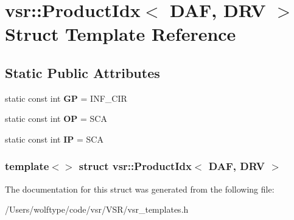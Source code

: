 \hypertarget{structvsr_1_1_product_idx_3_01_d_a_f_00_01_d_r_v_01_4}{\section{vsr\-:\-:Product\-Idx$<$ D\-A\-F, D\-R\-V $>$ Struct Template Reference}
\label{structvsr_1_1_product_idx_3_01_d_a_f_00_01_d_r_v_01_4}
}
\subsection*{Static Public Attributes}
\begin{DoxyCompactItemize}
\item 
\hypertarget{structvsr_1_1_product_idx_3_01_d_a_f_00_01_d_r_v_01_4_ad16ebae95e620d7daa02161b2a171a80}{static const int {\bfseries G\-P} = I\-N\-F\-\_\-\-C\-I\-R}\label{structvsr_1_1_product_idx_3_01_d_a_f_00_01_d_r_v_01_4_ad16ebae95e620d7daa02161b2a171a80}

\item 
\hypertarget{structvsr_1_1_product_idx_3_01_d_a_f_00_01_d_r_v_01_4_aa2055ffbbe2f718c8b54826d887d6a01}{static const int {\bfseries O\-P} = S\-C\-A}\label{structvsr_1_1_product_idx_3_01_d_a_f_00_01_d_r_v_01_4_aa2055ffbbe2f718c8b54826d887d6a01}

\item 
\hypertarget{structvsr_1_1_product_idx_3_01_d_a_f_00_01_d_r_v_01_4_a943f13fcefcdcb3484de87320937c5b5}{static const int {\bfseries I\-P} = S\-C\-A}\label{structvsr_1_1_product_idx_3_01_d_a_f_00_01_d_r_v_01_4_a943f13fcefcdcb3484de87320937c5b5}

\end{DoxyCompactItemize}
\subsubsection*{template$<$$>$ struct vsr\-::\-Product\-Idx$<$ D\-A\-F, D\-R\-V $>$}



The documentation for this struct was generated from the following file\-:\begin{DoxyCompactItemize}
\item 
/\-Users/wolftype/code/vsr/\-V\-S\-R/vsr\-\_\-templates.\-h\end{DoxyCompactItemize}
